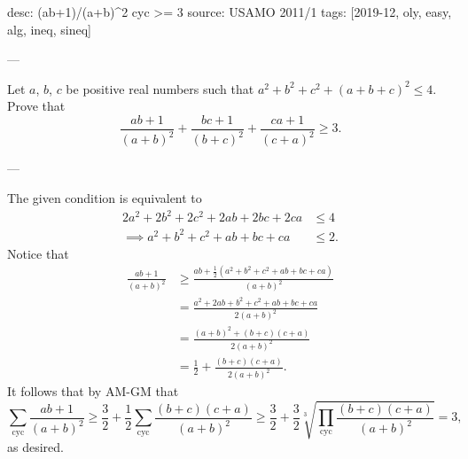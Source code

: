 desc: (ab+1)/(a+b)^2 cyc >= 3
source: USAMO 2011/1
tags: [2019-12, oly, easy, alg, ineq, sineq]

---

Let $a$, $b$, $c$ be positive real numbers such that $a^2+b^2+c^2+(a+b+c)^2\le 4$. Prove that \[\frac{ab+1}{(a+b)^2}+\frac{bc+1}{(b+c)^2}+\frac{ca+1}{(c+a)^2}\ge 3.\]

---

The given condition is equivalent to
\begin{align*}
    2a^2+2b^2+2c^2+2ab+2bc+2ca&\le 4\\
    \implies a^2+b^2+c^2+ab+bc+ca&\le 2.
\end{align*}
Notice that
\begin{align*}
    \frac{ab+1}{(a+b)^2}&\ge\frac{ab+\frac{1}{2}\left(a^2+b^2+c^2+ab+bc+ca\right)}{(a+b)^2}\\
    &=\frac{a^2+2ab+b^2+c^2+ab+bc+ca}{2(a+b)^2}\\
    &=\frac{(a+b)^2+(b+c)(c+a)}{2(a+b)^2}\\
    &=\frac{1}{2}+\frac{(b+c)(c+a)}{2(a+b)^2}.
\end{align*}
It follows that by AM-GM that\[\sum_{\mathrm{cyc}}\frac{ab+1}{(a+b)^2}\ge\frac{3}{2}+\frac{1}{2}\sum_{\mathrm{cyc}}\frac{(b+c)(c+a)}{(a+b)^2}\ge\frac{3}{2}+\frac{3}{2}\sqrt[3]{\prod_{\mathrm{cyc}}\frac{(b+c)(c+a)}{(a+b)^2}}=3,\]
as desired.
